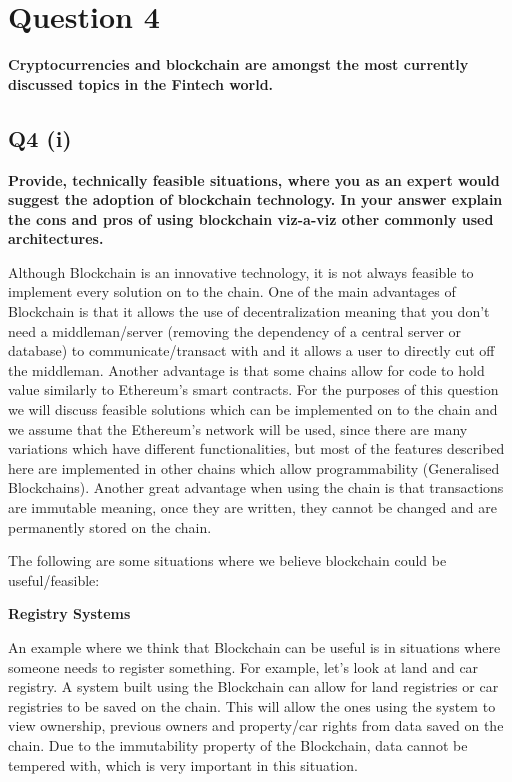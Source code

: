 \section{Question 4}\label{ssec:pt2q4}
\textbf{Cryptocurrencies and blockchain are amongst the most currently discussed topics in the Fintech world.}

\subsection{Q4 (i)}\label{sssec:pt2q4i}
\textbf{Provide, technically feasible situations, where you as an expert would suggest the adoption of blockchain technology. In your answer explain the cons and pros of using blockchain viz-a-viz other commonly used architectures.}

\noindent
Although Blockchain is an innovative technology, it is not always feasible to implement every solution on to the chain.  One of the main advantages of Blockchain is that it allows the use of decentralization meaning that you don’t need a middleman/server (removing the dependency of a central server or database) to communicate/transact with and it allows a user to directly cut off the middleman. Another advantage is that some chains allow for code to hold value similarly to Ethereum’s smart contracts. For the purposes of this question we will discuss feasible solutions which can be implemented on to the chain and we assume that the Ethereum’s network will be used, since there are many variations which have different functionalities, but most of the features described here are implemented in other chains which allow programmability (Generalised Blockchains). Another great advantage when using the chain is that transactions are immutable meaning, once they are written, they cannot be changed and are permanently stored on the chain. 

\noindent
The following are some situations where we believe blockchain could be useful/feasible:                     

\noindent
\textbf{Registry Systems}

\noindent
An example where we think that Blockchain can be useful is in situations where someone needs to register something. For example, let’s look at land and car registry. A system built using the Blockchain can allow for land registries or car registries to be saved on the chain. This will allow the ones using the system to view ownership, previous owners and property/car rights from data saved on the chain. Due to the immutability property of the Blockchain, data cannot be tempered with, which is very important in this situation.

